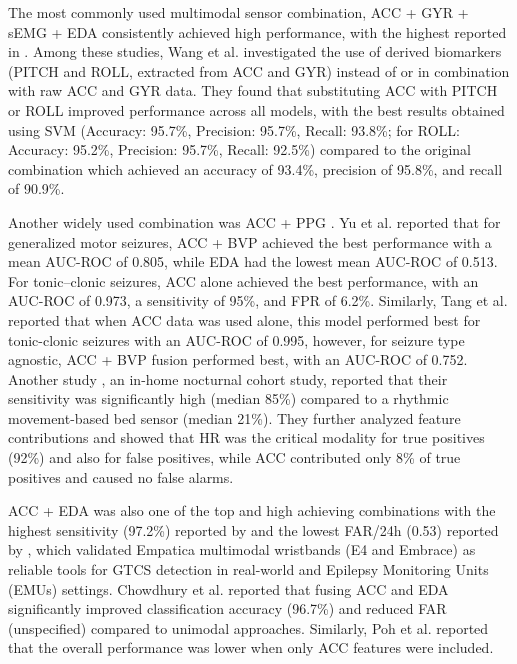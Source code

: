 The most commonly used multimodal sensor combination, ACC + GYR + sEMG + EDA \cite{Wang2025-ql, Ge2023-ab, Li2022-ty, Wu2024-yl, Wang2022-lt} consistently achieved high performance, with the highest reported in \cite{Wu2024-yl}. Among these studies, Wang et al. \cite{Wang2025-ql} investigated the use of derived biomarkers (PITCH and ROLL, extracted from ACC and GYR) instead of or in combination with raw ACC and GYR data. They found that substituting ACC with PITCH or ROLL improved performance across all models, with the best results obtained using SVM (Accuracy: 95.7\%, Precision: 95.7\%, Recall: 93.8\%; for ROLL: Accuracy: 95.2\%, Precision: 95.7\%, Recall: 92.5\%) compared to the original combination which achieved an accuracy of 93.4\%, precision of 95.8\%, and recall of 90.9\%. 

Another widely used combination was ACC + PPG \cite{Ali2020-ke, Tang2021-td, Arends2018-ew, Yu2023-ss}. Yu et al. \cite{Yu2023-ss} reported that for generalized motor seizures, ACC + BVP achieved the best performance with a mean AUC-ROC of 0.805, while EDA had the lowest mean AUC-ROC of 0.513. For tonic–clonic seizures, ACC alone achieved the best performance, with an AUC-ROC of 0.973, a sensitivity of 95\%, and FPR of 6.2\%. Similarly, Tang et al. \cite{Tang2021-td} reported that when ACC data was used alone, this model performed best for tonic-clonic seizures with an AUC-ROC of 0.995, however, for seizure type agnostic, ACC + BVP fusion performed best, with an AUC-ROC of 0.752. Another study \cite{Arends2018-ew}, an in-home nocturnal cohort study, reported that their sensitivity was significantly high (median 85\%) compared to a rhythmic movement-based bed sensor (median 21\%). They further analyzed feature contributions and showed that HR was the critical modality for true positives (92\%) and also for false positives, while ACC contributed only 8\% of true positives and caused no false alarms.

ACC + EDA was also one of the top and high achieving combinations \cite{Regalia2019-ch, Poh2012-af, Chowdhury2022-bi} with the highest sensitivity (97.2\%) reported by \cite{Chowdhury2022-bi} and the lowest FAR/24h (0.53) reported by \cite{Regalia2019-ch}, which validated Empatica multimodal wristbands (E4 and Embrace) as reliable tools for GTCS detection in real-world and Epilepsy Monitoring Units (EMUs) settings. Chowdhury et al. \cite{Chowdhury2022-bi} reported that fusing ACC and EDA significantly improved classification accuracy (96.7\%) and reduced FAR (unspecified) compared to unimodal approaches. Similarly, Poh et al. \cite{Poh2012-af} reported that the overall performance was lower when only ACC features were included.

